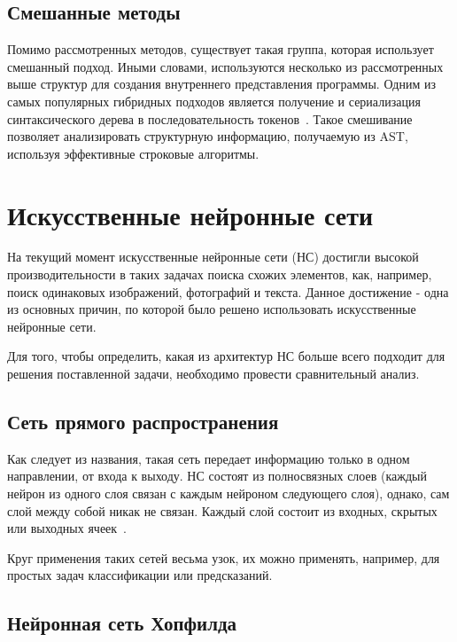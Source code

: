 \subsection{Смешанные методы}

Помимо рассмотренных методов, существует такая группа, которая использует смешанный подход. Иными словами, используются несколько из рассмотренных выше структур для создания внутреннего представления программы. Одним из самых популярных гибридных подходов является получение и сериализация синтаксического дерева в последовательность токенов~\cite{hybrid}. Такое смешивание позволяет анализировать структурную информацию, получаемую из AST, используя эффективные строковые алгоритмы. 

\section{Искусственные нейронные сети}

На текущий момент искусственные нейронные сети (НС) достигли высокой производительности в таких задачах поиска схожих элементов, как, например, поиск одинаковых изображений, фотографий и текста. Данное достижение - одна из основных причин, по которой было решено использовать искусственные нейронные сети.


Для того, чтобы определить, какая из архитектур НС больше всего подходит для решения поставленной задачи, необходимо провести сравнительный анализ. 

\subsection{Сеть прямого распространения}

Как следует из названия, такая сеть передает информацию только в одном направлении, от входа к выходу. НС состоят из полносвязных слоев (каждый нейрон из одного слоя связан с каждым нейроном следующего слоя), однако, сам слой между собой никак не связан. Каждый слой состоит из входных, скрытых или выходных ячеек~\cite{perceptron}. 

Круг применения таких сетей весьма узок, их можно применять, например, для простых задач классификации или предсказаний. 

\subsection{Нейронная сеть Хопфилда}

